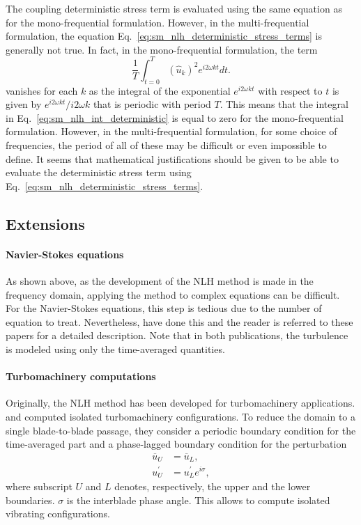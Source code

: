 The coupling deterministic stress term is evaluated using the
same equation as for the mono-frequential formulation.
However, in the multi-frequential formulation, 
the equation Eq.~\eqref{eq:sm_nlh_deterministic_stress_terms}
is generally not true.
In fact, in the mono-frequential formulation, the term
\begin{equation}
	\frac{1}{T} \int_{t=0}^{T} (\widehat{u}_k)^2
		e^{i 2 \omega k t} dt.
	\label{eq:sm_nlh_int_deterministic}
\end{equation}
vanishes for each $k$ as the integral of the
exponential $e^{i 2 \omega k t}$ with respect to $t$
is given by $e^{i 2 \omega k t} / i 2 \omega k$ that is
periodic with period $T$. This means that the integral in 
Eq.~\eqref{eq:sm_nlh_int_deterministic} is equal to zero
for the mono-frequential formulation. 
However, in the multi-frequential
formulation, for some choice of frequencies, the period of all
of these may be difficult or even impossible to define. It
seems that mathematical justifications should be given
to be able to evaluate the deterministic stress term 
using Eq.~\eqref{eq:sm_nlh_deterministic_stress_terms}.

\subsection{Extensions}

\paragraph{Navier-Stokes equations}
As shown above, as the development of the NLH
method is made in the frequency domain, applying the method to
complex equations can be difficult. For the Navier-Stokes equations,
this step is tedious due to the number of equation to treat. Nevertheless, 
\citet{He1998, Chen2001, He2002, Vilmin2006} have
done this and the reader is referred to these papers
for a detailed description.
Note that in both publications, the turbulence is modeled
using only the time-averaged quantities.

\paragraph{Turbomachinery computations}
Originally, the NLH method has been developed for 
turbomachinery applications. \citet{He1998} and
\citet{Ning1998} computed isolated turbomachinery
configurations. To reduce the domain to a single 
blade-to-blade passage, they consider a periodic
boundary condition for the time-averaged part and a
phase-lagged boundary condition for the perturbation
\begin{equation}
    \begin{split}
    	\overline{u}_U &= \overline{u}_L, \\
    	u^\prime_U &= u^\prime_L e^{i \sigma},
    \end{split}
\end{equation}
where subscript $U$ and $L$ denotes, respectively, 
the upper and the lower boundaries. $\sigma$ is the
interblade phase angle. This allows to compute
isolated vibrating configurations.

